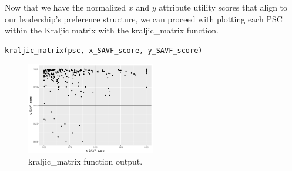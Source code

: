 \documentclass[twocolumn]{svjour3}       %
\begin{document}
Now that we have the normalized $x$ and $y$ attribute utility scores that align to our leadership's preference structure, we can proceed with plotting each PSC within the Kraljic matrix with the kraljic\_matrix function.
\begin{verbatim}
kraljic_matrix(psc, x_SAVF_score, y_SAVF_score)
\end{verbatim}

\begin{figure}[!htb]
  \includegraphics[width=0.5\textwidth]{fig5.png}
  \caption{kraljic\_matrix function output.}
  \label{fig:5}
\end{figure}
\end{document}
